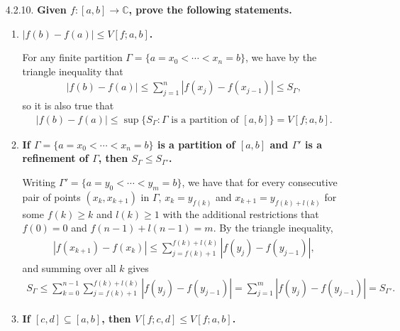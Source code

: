 \documentclass[a4paper,12pt]{article}
\begin{document}
\begin{enumerate}
    \item[4.2.10.]
        \boldmath\textbf{Given $f : [a, b] \to \mathbb{C}$, prove the following statements.
        }\unboldmath \par
        \begin{enumerate}
            \item
                \boldmath\textbf{$|f(b) - f(a)| \leq V[f; a, b]$.
                }\unboldmath \par
                For any finite partition
                $\Gamma = \{ a = x_0 < \cdots < x_n = b \}$,
                we have by the triangle inequality that
                \begin{align*}
                    |f(b) - f(a)| \leq \sum_{j = 1}^n |f(x_j) - f(x_{j - 1})| \leq S_\Gamma,
                \end{align*}
                so it is also true that
                \begin{align*}
                    |f(b) - f(a)| \leq \sup\{ S_\Gamma : \Gamma \text{ is a partition of } [a, b] \} = V[f; a, b].
                \end{align*}
            \item
                \boldmath\textbf{If $\Gamma = \{ a = x_0 < \cdots < x_n = b \}$ is a partition of $[a, b]$ and $\Gamma'$ is a refinement of $\Gamma$, then $S_\Gamma \leq S_{\Gamma'}$.
                }\unboldmath \par
                Writing
                $\Gamma' = \{ a = y_0 < \cdots < y_m = b \}$,
                we have that for every consecutive pair of points $(x_k, x_{k + 1})$ in $\Gamma$, $x_k = y_{f(k)}$ and $x_{k + 1} = y_{f(k) + l(k)}$ for some $f(k) \geq k$ and $l(k) \geq 1$ with the additional restrictions that $f(0) = 0$ and $f(n - 1) + l(n - 1) = m$. By the triangle inequality,
                \begin{align*}
                    |f(x_{k + 1}) - f(x_k)| \leq \sum_{j = f(k) + 1}^{f(k) + l(k)} |f(y_j) - f(y_{j - 1})|,
                \end{align*}
                and summing over all $k$ gives
                \begin{align*}
                    S_\Gamma %
                    \leq \sum_{k = 0}^{n - 1} \sum_{j = f(k) + 1}^{f(k) + l(k)} |f(y_j) - f(y_{j - 1})| = \sum_{j = 1}^m |f(y_j) - f(y_{j - 1})| = S_{\Gamma'}.
                \end{align*}
            \item
                \boldmath\textbf{If $[c, d] \subseteq [a, b]$, then $V[f; c, d] \leq V[f; a, b]$.
}
\end{enumerate}
\end{enumerate}
\end{document}
